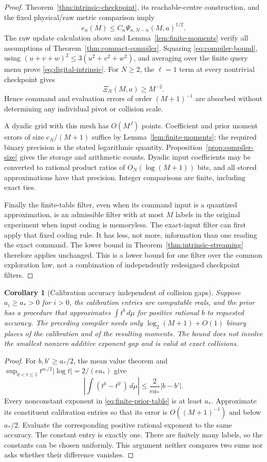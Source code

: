 \documentclass[11pt]{amsart}
\newtheorem{corollary}[theorem]{Corollary}
\theoremstyle{definition}\newtheorem{definition}[theorem]{Definition}
\theoremstyle{remark}\newtheorem{remark}[theorem]{Remark}
\begin{document}
\begin{proof}
Theorem~\ref{thm:intrinsic-checkpoint}, its reachable-centre construction,
and the fixed physical/raw metric comparison imply
\[
 e_n(M)\le C_n\Psi_{n,N-n}(M,a)^{1/2}.
\]
The raw update calculation above and Lemma~\ref{lem:finite-moments}
verify all assumptions of Theorem~\ref{thm:compact-compiler}. Squaring
\eqref{eq:compiler-bound}, using
$(u+v+w)^2\le3(u^2+v^2+w^2)$, and averaging over the finite query
menu prove \eqref{eq:digital-intrinsic}. For $N\ge2$, the $\ell=1$
term at every nontrivial checkpoint gives
\[
 \Xi_N(M,a)\ge M^{-2}.
\]
Hence command and evaluation errors of order $(M+1)^{-1}$ are absorbed
without determining any individual pivot or collision scale.

A dyadic grid with this mesh has $O(M^J)$ points. Coefficient and prior
moment errors of size $c_N/(M+1)$ suffice by
Lemma~\ref{lem:finite-moments}; the required binary precision is the
stated logarithmic quantity. Proposition~\ref{prop:compiler-size} gives
the storage and arithmetic counts. Dyadic input coefficients may be
converted to rational product ratios of $O_N(\log(M+1))$ bits, and all
stored approximations have that precision. Integer comparisons are
finite, including exact ties.

Finally the finite-table filter, even when its command input is a
quantized approximation, is an admissible filter with at most $M$
labels in the original experiment when input coding is memoryless.
The exact-input filter can first apply that fixed coding rule. It has less, not more, information
than one reading the exact command. The lower bound in
Theorem~\ref{thm:intrinsic-streaming} therefore applies unchanged.
This is a lower bound for one filter over the common exploration law,
not a combination of independently redesigned checkpoint filters.
\end{proof}

\begin{corollary}[Calibration accuracy independent of collision gaps]
\label{cor:calibration-precision}
Suppose $a_i\ge a_*>0$ for $i>0$, the calibration entries are
computable reals, and the prior has a procedure that approximates
$\int t^b\,d\mu$ for positive rational $b$ to requested accuracy.
The preceding compiler needs only $\log_2(M+1)+O(1)$ binary places
of the calibration and of the resulting moments. The bound does not
involve the smallest nonzero additive exponent gap and is valid at
exact collisions.
\end{corollary}
\begin{proof}
For $b,b'\ge a_*/2$, the mean value theorem and
$\sup_{0<t\le1}t^{a_*/2}|\log t|=2/(e a_*)$ give
\[
 \left|\int(t^b-t^{b'})\,d\mu\right|
                   \le\frac{2}{e a_*}|b-b'|.
\]
Every nonconstant exponent in \eqref{eq:finite-prior-table} is at least
$a_*$. Approximate its constituent calibration entries so that its
error is $O((M+1)^{-1})$ and below $a_*/2$. Evaluate the corresponding
positive rational exponent to the same accuracy. The constant entry
is exactly one. There are finitely many labels, so the constants can
be chosen uniformly. This argument neither compares two sums nor asks
whether their difference vanishes.
\end{proof}
\end{document}
